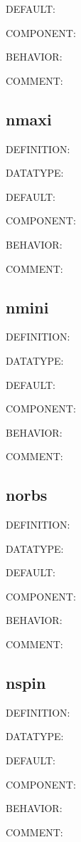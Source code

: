 {\color{blue}DEFAULT:}

{\color{brown}COMPONENT:}

{\color{purple}BEHAVIOR:}

{\color{olive}COMMENT:}

\subsection{nmaxi}
{\color{red}DEFINITION:}

{\color{green}DATATYPE:}

{\color{blue}DEFAULT:}

{\color{brown}COMPONENT:}

{\color{purple}BEHAVIOR:}

{\color{olive}COMMENT:}

\subsection{nmini}
{\color{red}DEFINITION:}

{\color{green}DATATYPE:}

{\color{blue}DEFAULT:}

{\color{brown}COMPONENT:}

{\color{purple}BEHAVIOR:}

{\color{olive}COMMENT:}

\subsection{norbs}
{\color{red}DEFINITION:}

{\color{green}DATATYPE:}

{\color{blue}DEFAULT:}

{\color{brown}COMPONENT:}

{\color{purple}BEHAVIOR:}

{\color{olive}COMMENT:}

\subsection{nspin}
{\color{red}DEFINITION:}

{\color{green}DATATYPE:}

{\color{blue}DEFAULT:}

{\color{brown}COMPONENT:}

{\color{purple}BEHAVIOR:}

{\color{olive}COMMENT:}
